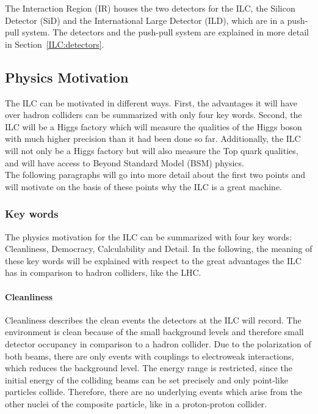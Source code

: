 The Interaction Region (IR) houses the two detectors for the ILC, the Silicon Detector (SiD) and the International Large Detector (ILD), which are in a push-pull system.
The detectors and the push-pull system are explained in more detail in Section~\ref{ILC:detectors}.

\subsection{Physics Motivation}
\label{ILC:physicsmotivation}

The ILC can be motivated in different ways.
First, the advantages it will have over hadron colliders can be summarized with only four key words.
Second, the ILC will be a Higgs factory which will measure the qualities of the Higgs boson with much higher precision than it had been done so far.
Additionally, the ILC will not only be a Higgs factory but will also measure the Top quark qualities, and will have access to Beyond Standard Model (BSM) physics.\\
The following paragraphs will go into more detail about the first two points and will motivate on the basis of these points why the ILC is a great machine.

\subsubsection{Key words}
The physics motivation for the ILC can be summarized with four key words: Cleanliness, Democracy, Calculability and Detail.\cite[p. 2-5]{TDR2}
In the following, the meaning of these key words will be explained with respect to the great advantages the ILC has in comparison to hadron colliders, like the LHC.
\paragraph{Cleanliness}
Cleanliness describes the clean events the detectors at the ILC will record.
The environment is clean because of the small background levels and therefore small detector occupancy in comparison to a hadron collider.
Due to the polarization of both beams, there are only events with couplings to electroweak interactions, which reduces the background level.
The energy range is restricted, since the initial energy of the colliding beams can be set precisely and only point-like particles collide.
Therefore, there are no underlying events which arise from the other nuclei of the composite particle, like in a proton-proton collider.

